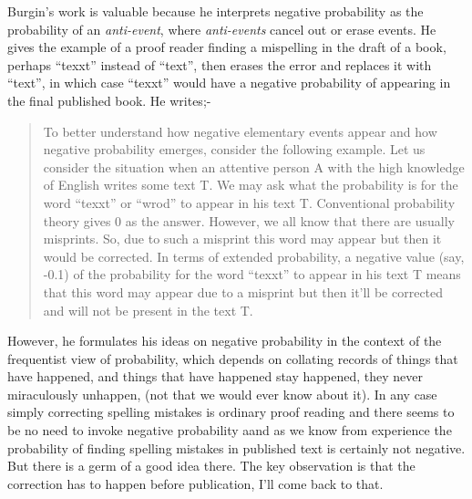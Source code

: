 Burgin's work is valuable because he interprets negative probability as the probability of an
\emph{anti-event}, where \emph{anti-events} cancel out or erase events. He gives the example of
a proof reader finding a mispelling in the draft of a book, perhaps \enquote{texxt} instead of
\enquote{text}, then erases the error and replaces it with \enquote{text}, in which case
\enquote{texxt} would have a negative probability of appearing in the final published book. He
writes;-
\begin{quotation}
To better understand how negative elementary events appear and how negative probability emerges,
consider the following example. Let us consider the situation when an attentive person A with
the high knowledge of English writes some text T. We may ask what the probability is for the
word \enquote{texxt} or \enquote{wrod} to appear in his text T. Conventional probability theory
gives 0 as the answer. However, we all know that there are usually misprints. So, due to such a
misprint this word may appear but then it would be corrected. In terms of extended probability,
a negative value (say, -0.1) of the probability for the word \enquote{texxt} to appear in his
text T means that this word may appear due to a misprint but then it'll be corrected and will
not be present in the text T. \hfill \autocite{burgin2010interpretations}
\end{quotation}

However, he formulates his ideas on negative probability in the context of the frequentist view
of probability, which depends on collating records of things that have happened, and things that
have happened stay happened, they never miraculously unhappen, (not that we would ever know
about it). In any case simply correcting spelling mistakes is ordinary proof reading and there
seems to be no need to invoke negative probability aand as we know from experience the
probability of finding spelling mistakes in published text is certainly not negative. But there
is a germ of a good idea there. The key observation is that the correction has to happen before
publication, I'll come back to that.

